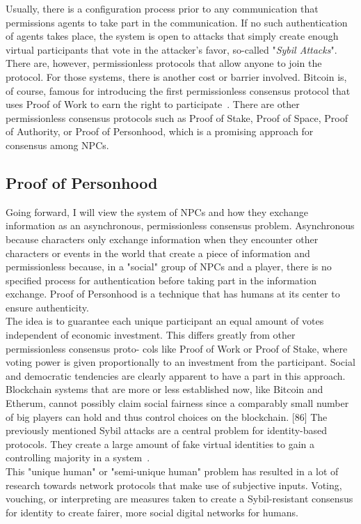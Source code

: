 Usually, there is a configuration process prior to any communication that permissions agents to take part in the communication. If no such authentication of agents takes place, the system is open to attacks that simply create enough virtual participants that vote in the attacker's favor, so-called "\textit{Sybil Attacks}". There are, however, permissionless protocols that allow anyone to join the protocol. For those systems, there is another cost or barrier involved. Bitcoin is, of course, famous for introducing the first permissionless consensus protocol that uses Proof of Work to earn the right to participate~\cite{Gervais2016}. There are other permissionless consensus protocols such as Proof of Stake, Proof of Space, Proof of Authority, or Proof of Personhood, which is a promising approach for consensus among NPCs.~\cite{Coulouris2001}
\subsection{Proof of Personhood}
Going forward, I will view the system of NPCs and how they exchange information as an asynchronous, permissionless consensus problem. Asynchronous because characters only exchange information when they encounter other characters or events in the world that create a piece of information and permissionless because, in a "social" group of NPCs and a player, there is no specified process for authentication before taking part in the information exchange. Proof of Personhood is a technique that has humans at its center to ensure authenticity.~\cite{Borge2017}\\
The idea is to guarantee each unique participant an equal amount of votes independent of economic investment. This differs greatly from other permissionless consensus proto- cols like Proof of Work or Proof of Stake, where voting power is given proportionally to an investment from the participant. Social and democratic tendencies are clearly apparent to have a part in this approach. Blockchain systems that are more or less established now, like Bitcoin and Etherum, cannot possibly claim social fairness since a comparably small number of big players can hold and thus control choices on the blockchain. [86] The previously mentioned Sybil attacks are a central problem for identity-based protocols. They create a large amount of fake virtual identities to gain a controlling majority in a system~\cite{Douceur2002}.\\
This "unique human" or "semi-unique human" problem has resulted in a lot of research towards network protocols that make use of subjective inputs. Voting, vouching, or interpreting are measures taken to create a Sybil-resistant consensus for identity to create fairer, more social digital networks for humans.~\cite{Siddarth2020}\\
